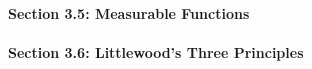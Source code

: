 \documentclass{article}
\begin{document}



\textbf{\large Section 3.5: Measurable Functions} \\\\






\textbf{\large Section 3.6: Littlewood's Three Principles} \\\\



\end{document}
